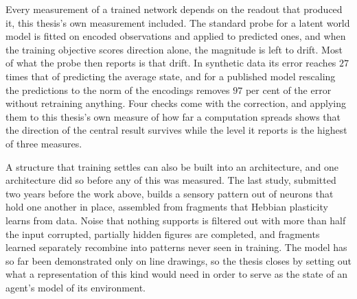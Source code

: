 Every measurement of a trained network depends on the readout that produced
it, this thesis's own measurement included. The standard probe for a latent world model is
fitted on encoded observations and applied to predicted ones, and when the training objective
scores direction alone, the magnitude is left to drift. Most of what the
probe then reports is that drift. In synthetic data
its error reaches $27$ times that of predicting the average state, and for a
published model rescaling the predictions to the norm of the encodings removes
$97$ per cent of the error without retraining anything. Four checks come with
the correction, and applying them to this thesis's own measure of how far a
computation spreads shows that the direction of the central result survives
while the level it reports is the highest of three measures.

A structure that training settles can also be built into an architecture,
and one architecture did so before any of this was measured. The last study, submitted
two years before the work above, builds a sensory pattern out of neurons that
hold one another in place, assembled from fragments that Hebbian plasticity
learns from data. Noise that nothing supports is filtered out with more than
half the input corrupted, partially hidden figures are completed, and
fragments learned separately recombine into patterns never seen in training.
The model has so far been demonstrated only on line drawings, so the thesis
closes by setting out what a
representation of this kind would need in order to serve as the state of an
agent's model of its environment.
